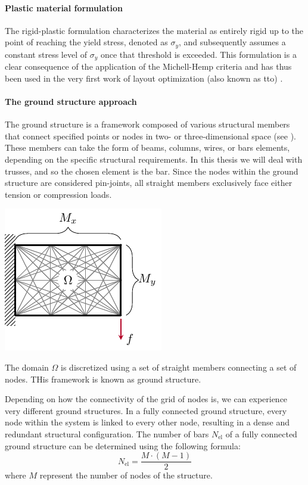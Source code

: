 \paragraph{Plastic material formulation}
The rigid-plastic formulation characterizes the material as entirely rigid up to the point of reaching the yield stress, denoted as $\sigma_y$, and subsequently assumes a constant stress level of $\sigma_y$ once that threshold is exceeded. This formulation is a clear consequence of the application of the Michell-Hemp criteria and has thus been used in the very first work of layout optimization (also known as \gls{tto}) . 

\paragraph{The ground structure approach}
The ground structure is a framework composed of various structural members that connect specified points or nodes in two- or three-dimensional space (see ). These members can take the form of beams, columns, wires, or bars elements, depending on the specific structural requirements. In this thesis we will deal with trusses, and so the chosen element is the bar. Since the nodes within the ground structure are considered pin-joints, all straight members exclusively face either tension or compression loads. 
\begin{marginfigure}
    \centering
    \includegraphics{figures/03_comparison_TO_TTO/03_disc_mesh/d_mesh.pdf}
    \caption{The domain $\Omega$ is discretized using a set of straight members connecting a set of nodes. THis framework is known as ground structure.}
    \label{fig:03_mesh_d}
\end{marginfigure}

Depending on how the connectivity of the grid of nodes is, we can experience very different ground structures. In a fully connected ground structure, every node within the system is linked to every other node, resulting in a dense and redundant structural configuration. The number of bars $N_{\text{el}}$ of a fully connected ground structure can be determined using the following formula:
\begin{equation}
    N_{\text{el}} = \frac{M \cdot (M-1)}{2}
\end{equation}
where $M$ represent the number of nodes of the structure.

